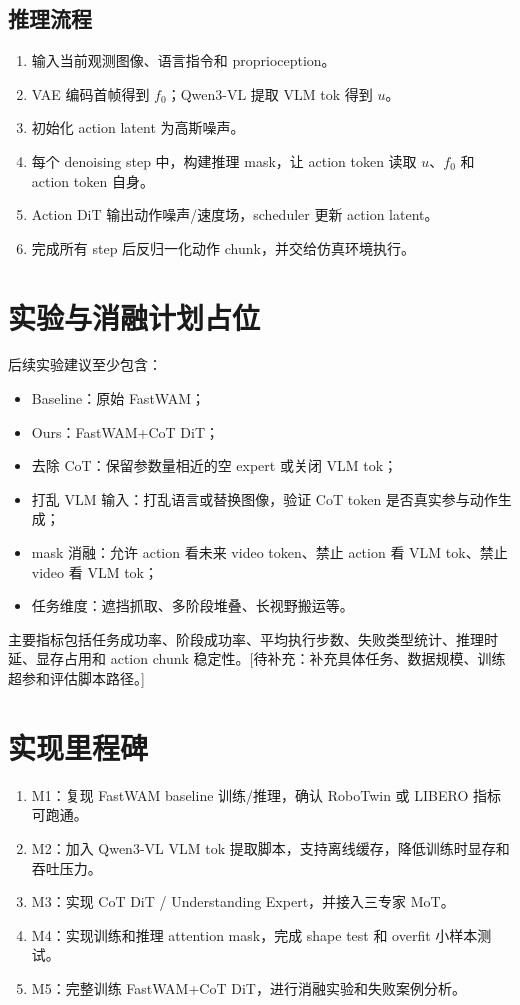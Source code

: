 \documentclass[UTF8,a4paper,11pt]{ctexart}
\newcommand{\todo}[1]{\textcolor{red!70!black}{[待补充：#1]}}
\begin{document}
\subsection{推理流程}

\begin{enumerate}[leftmargin=1.8em]
  \item 输入当前观测图像、语言指令和 proprioception。
  \item VAE 编码首帧得到 $f_0$；Qwen3-VL 提取 VLM tok 得到 $u$。
  \item 初始化 action latent 为高斯噪声。
  \item 每个 denoising step 中，构建推理 mask，让 action token 读取 $u$、$f_0$ 和 action token 自身。
  \item Action DiT 输出动作噪声/速度场，scheduler 更新 action latent。
  \item 完成所有 step 后反归一化动作 chunk，并交给仿真环境执行。
\end{enumerate}

\section{实验与消融计划占位}

后续实验建议至少包含：
\begin{itemize}[leftmargin=1.6em]
  \item Baseline：原始 FastWAM；
  \item Ours：FastWAM+CoT DiT；
  \item 去除 CoT：保留参数量相近的空 expert 或关闭 VLM tok；
  \item 打乱 VLM 输入：打乱语言或替换图像，验证 CoT token 是否真实参与动作生成；
  \item mask 消融：允许 action 看未来 video token、禁止 action 看 VLM tok、禁止 video 看 VLM tok；
  \item 任务维度：遮挡抓取、多阶段堆叠、长视野搬运等。
\end{itemize}

主要指标包括任务成功率、阶段成功率、平均执行步数、失败类型统计、推理时延、显存占用和 action chunk 稳定性。\todo{补充具体任务、数据规模、训练超参和评估脚本路径。}

\section{实现里程碑}

\begin{enumerate}[leftmargin=1.8em]
  \item M1：复现 FastWAM baseline 训练/推理，确认 RoboTwin 或 LIBERO 指标可跑通。
  \item M2：加入 Qwen3-VL VLM tok 提取脚本，支持离线缓存，降低训练时显存和吞吐压力。
  \item M3：实现 CoT DiT / Understanding Expert，并接入三专家 MoT。
  \item M4：实现训练和推理 attention mask，完成 shape test 和 overfit 小样本测试。
  \item M5：完整训练 FastWAM+CoT DiT，进行消融实验和失败案例分析。
\end{enumerate}
\end{document}
